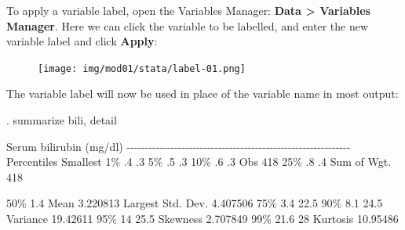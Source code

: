 \documentclass[
  a4paper,
]{memoir}
\newenvironment{Shaded}{\begin{snugshade}}{\end{snugshade}}
\newcommand{\DecValTok}[1]{\textcolor[rgb]{0.00,0.00,0.00}{#1}}
\newcommand{\FloatTok}[1]{\textcolor[rgb]{0.00,0.00,0.00}{#1}}
\newcommand{\FunctionTok}[1]{\textcolor[rgb]{0.00,0.00,0.00}{#1}}
\newcommand{\NormalTok}[1]{\textcolor[rgb]{0.00,0.00,0.00}{#1}}
\newcommand{\SpecialCharTok}[1]{\textcolor[rgb]{0.00,0.00,0.00}{#1}}
\begin{document}
To apply a variable label, open the Variables Manager: \textbf{Data
\textgreater{} Variables Manager}. Here we can click the variable to be
labelled, and enter the new variable label and click \textbf{Apply}:

\begin{figure}[H]

{\centering \texttt{[image: img/mod01/stata/label-01.png]}

}

\end{figure}

The variable label will now be used in place of the variable name in
most output:

\begin{Shaded}
\begin{Highlighting}[]
\NormalTok{. summarize bili, detail}

\NormalTok{                   Serum }\FunctionTok{bilirubin}\NormalTok{ (mg}\SpecialCharTok{/}\NormalTok{dl)}
\SpecialCharTok{{-}{-}{-}{-}{-}{-}{-}{-}{-}{-}{-}{-}{-}{-}{-}{-}{-}{-}{-}{-}{-}{-}{-}{-}{-}{-}{-}{-}{-}{-}{-}{-}{-}{-}{-}{-}{-}{-}{-}{-}{-}{-}{-}{-}{-}{-}{-}{-}{-}{-}{-}{-}{-}{-}{-}{-}{-}{-}{-}{-}{-}}
\NormalTok{      Percentiles      Smallest}
 \DecValTok{1}\NormalTok{\%           .}\DecValTok{4}\NormalTok{             .}\DecValTok{3}
 \DecValTok{5}\NormalTok{\%           .}\DecValTok{5}\NormalTok{             .}\DecValTok{3}
\DecValTok{10}\NormalTok{\%           .}\DecValTok{6}\NormalTok{             .}\DecValTok{3}\NormalTok{       Obs                 }\DecValTok{418}
\DecValTok{25}\NormalTok{\%           .}\DecValTok{8}\NormalTok{             .}\DecValTok{4}\NormalTok{       Sum of Wgt.         }\DecValTok{418}

\DecValTok{50}\NormalTok{\%          }\FloatTok{1.4}\NormalTok{                      Mean           }\FloatTok{3.220813}
\NormalTok{                        Largest       Std. Dev.      }\FloatTok{4.407506}
\DecValTok{75}\NormalTok{\%          }\FloatTok{3.4}           \FloatTok{22.5}
\DecValTok{90}\NormalTok{\%          }\FloatTok{8.1}           \FloatTok{24.5}\NormalTok{       Variance       }\FloatTok{19.42611}
\DecValTok{95}\NormalTok{\%           }\DecValTok{14}           \FloatTok{25.5}\NormalTok{       Skewness       }\FloatTok{2.707849}
\DecValTok{99}\NormalTok{\%         }\FloatTok{21.6}             \DecValTok{28}\NormalTok{       Kurtosis       }\FloatTok{10.95486}
\end{Highlighting}
\end{Shaded}
\end{document}
